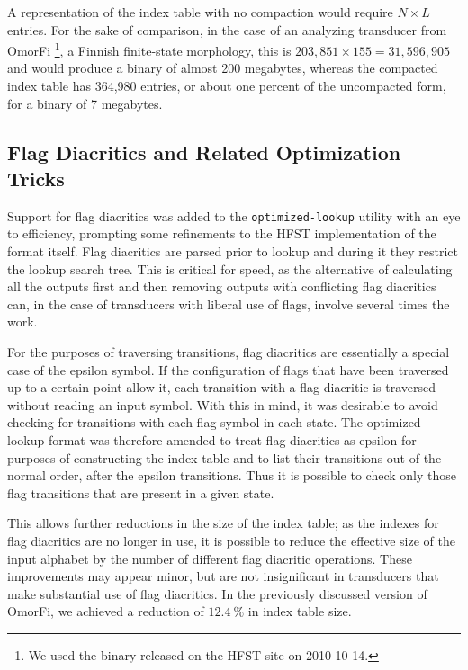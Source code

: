 \documentclass{llncs}
\begin{document}
A representation of the index table with no compaction would require
$N \times L$ entries. For the sake of comparison, in the case of an analyzing
transducer from OmorFi \footnote{We used the binary released on the HFST site on
2010-10-14.}, a Finnish finite-state morphology, this is
$203,851 \times 155 = 31,596,905$ and would produce a binary of almost 200
megabytes, whereas the compacted index table has 364,980 entries, or about
one percent of the uncompacted form, for a binary of 7 megabytes.

\subsection{Flag Diacritics and Related Optimization Tricks}\label{flag-diacritics}
Support for flag diacritics was added to the \verb+optimized-lookup+ utility
with an eye to efficiency, prompting some refinements to the HFST implementation
of the format itself. Flag diacritics are parsed prior to lookup and during
it they restrict the lookup search tree. This is critical for speed, as the
alternative of calculating all the outputs first and then removing outputs
with conflicting flag diacritics can, in the case of transducers with liberal
use of flags, involve several times the work.

For the purposes of traversing transitions, flag diacritics are essentially
a special case of the epsilon symbol. If the configuration of flags
that have been traversed up to a certain point allow it, each transition
with a flag diacritic is traversed without reading an input symbol. With
this in mind, it was desirable to avoid checking for transitions with each
flag symbol in each state. The optimized-lookup format was therefore amended
to treat flag diacritics as epsilon for purposes of constructing the index
table and to list their transitions out of the normal order, after the epsilon
transitions. Thus it is possible to check only those flag transitions that
are present in a given state.

This allows further reductions in the size of the index table; as
the indexes for flag diacritics are no longer in use, it is possible to reduce
the effective size of the input alphabet by the number of different flag
diacritic operations. These improvements may appear minor, but are not
insignificant in transducers that make substantial use of flag diacritics. In
the previously discussed version of OmorFi, we achieved a reduction of $12.4~\%$
in index table size.
\end{document}
